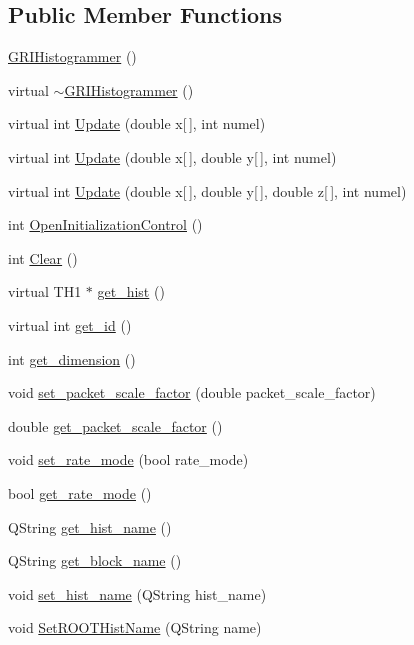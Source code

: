\subsection*{\-Public \-Member \-Functions}
\begin{DoxyCompactItemize}
\item 
\hyperlink{classGRIHistogrammer_ae4a817e9cf84d376cf39047c60ffc0ee}{\-G\-R\-I\-Histogrammer} ()
\item 
virtual \hyperlink{classGRIHistogrammer_abbcc2c725ae417acb078fd4dfa20ca99}{$\sim$\-G\-R\-I\-Histogrammer} ()
\item 
virtual int \hyperlink{classGRIHistogrammer_aebab3a7be1897725c6ab031266458b71}{\-Update} (double x\mbox{[}$\,$\mbox{]}, int numel)
\item 
virtual int \hyperlink{classGRIHistogrammer_aba8518e4a4faf8f720ccb72c33a58170}{\-Update} (double x\mbox{[}$\,$\mbox{]}, double y\mbox{[}$\,$\mbox{]}, int numel)
\item 
virtual int \hyperlink{classGRIHistogrammer_a0b8887e25d3ea7afda494162a58c4624}{\-Update} (double x\mbox{[}$\,$\mbox{]}, double y\mbox{[}$\,$\mbox{]}, double z\mbox{[}$\,$\mbox{]}, int numel)
\item 
int \hyperlink{classGRIHistogrammer_ae26d0c4f6de2d6e390baedafdd186ecf}{\-Open\-Initialization\-Control} ()
\item 
int \hyperlink{classGRIHistogrammer_aedd3ddf918f7eb6c35f8c8eec52757a5}{\-Clear} ()
\item 
virtual \-T\-H1 $\ast$ \hyperlink{classGRIHistogrammer_ac785fd203cbb106a701b40566caf54f2}{get\-\_\-hist} ()
\item 
virtual int \hyperlink{classGRIHistogrammer_a5e7c935824685b6738c48f02c5ee912a}{get\-\_\-id} ()
\item 
int \hyperlink{classGRIHistogrammer_abc2c2209c62c263bcb5fcc59f22e85ad}{get\-\_\-dimension} ()
\item 
void \hyperlink{classGRIHistogrammer_af15e37831a93b59748b8ff6e50f0e473}{set\-\_\-packet\-\_\-scale\-\_\-factor} (double packet\-\_\-scale\-\_\-factor)
\item 
double \hyperlink{classGRIHistogrammer_ad9f39945cb0260038ccf00e2e41e2cf8}{get\-\_\-packet\-\_\-scale\-\_\-factor} ()
\item 
void \hyperlink{classGRIHistogrammer_a0634efb03fd83becc5c976607d479b8b}{set\-\_\-rate\-\_\-mode} (bool rate\-\_\-mode)
\item 
bool \hyperlink{classGRIHistogrammer_ac777ea7b3134fe1b6aaf1ad04589d94c}{get\-\_\-rate\-\_\-mode} ()
\item 
\-Q\-String \hyperlink{classGRIHistogrammer_a73de69cf00cb00ceba3b72db39544b06}{get\-\_\-hist\-\_\-name} ()
\item 
\-Q\-String \hyperlink{classGRIHistogrammer_a8aa242e235d8bfb6ad176e381641d7e5}{get\-\_\-block\-\_\-name} ()
\item 
void \hyperlink{classGRIHistogrammer_adaee43df920362e8b352bdd514604bce}{set\-\_\-hist\-\_\-name} (\-Q\-String hist\-\_\-name)
\item 
void \hyperlink{classGRIHistogrammer_ab28cfc3ca048c949eb57069bb3c4e218}{\-Set\-R\-O\-O\-T\-Hist\-Name} (\-Q\-String name)
\end{DoxyCompactItemize}
